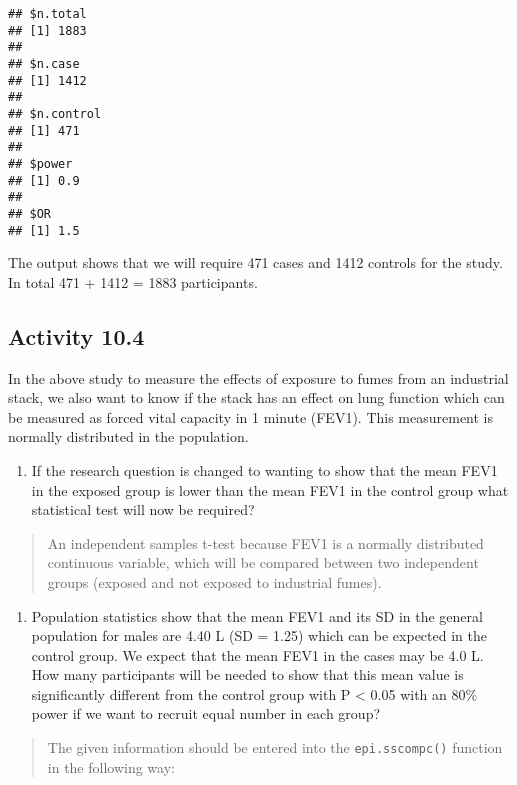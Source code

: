 \documentclass[
]{memoir}
\providecommand{\tightlist}{%
  \setlength{\itemsep}{0pt}\setlength{\parskip}{0pt}}
\begin{document}
\begin{verbatim}
## $n.total
## [1] 1883
## 
## $n.case
## [1] 1412
## 
## $n.control
## [1] 471
## 
## $power
## [1] 0.9
## 
## $OR
## [1] 1.5
\end{verbatim}

The output shows that we will require 471 cases and 1412 controls for the study. In total 471 + 1412 = 1883 participants.

\hypertarget{activity-10.4}{%
\subsection*{Activity 10.4}\label{activity-10.4}}

In the above study to measure the effects of exposure to fumes from an industrial stack, we also want to know if the stack has an effect on lung function which can be measured as forced vital capacity in 1 minute (FEV1). This measurement is normally distributed in the population.

\begin{enumerate}
\def\labelenumi{\alph{enumi})}
\tightlist
\item
  If the research question is changed to wanting to show that the mean FEV1 in the exposed group is lower than the mean FEV1 in the control group what statistical test will now be required?
\end{enumerate}

\begin{quote}
An independent samples t-test because FEV1 is a normally distributed continuous variable, which will be compared between two independent groups (exposed and not exposed to industrial fumes).
\end{quote}

\begin{enumerate}
\def\labelenumi{\alph{enumi})}
\setcounter{enumi}{1}
\tightlist
\item
  Population statistics show that the mean FEV1 and its SD in the general population for males are 4.40 L (SD = 1.25) which can be expected in the control group. We expect that the mean FEV1 in the cases may be 4.0 L. How many participants will be needed to show that this mean value is significantly different from the control group with P \textless{} 0.05 with an 80\% power if we want to recruit equal number in each group?
\end{enumerate}

\begin{quote}
The given information should be entered into the \texttt{epi.sscompc()} function in the following way:
\end{quote}
\end{document}
